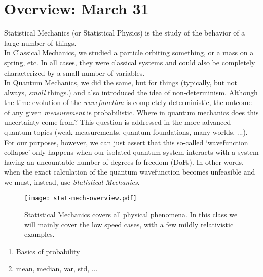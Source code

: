 \section{Overview: March 31}
\label{s:probability}

Statistical Mechanics (or Statistical Physics) is the study of the behavior of a large number of things.
\\

In Classical Mechanics, we studied a particle orbiting something, or a mass on a spring, etc. In all cases, they were classical systems and could also be completely characterized by a small number of variables.
\\

In Quantum Mechanics, we did the same, but for things (typically, but not always, \textit{small} things.) and also introduced the idea of non-determinism. Although the time evolution of the \emph{wavefunction} is completely deterministic, the outcome of any given \emph{measurement} is probabilistic. Where in quantum mechanics does this uncertainty come from? This question is addressed in the more advanced quantum topics (weak measurements, quantum foundations, many-worlds, ...). For our purposes, however, we can just assert that this so-called `wavefunction collapse' only happens when our isolated quantum system interacts with a system having an uncountable number of degrees fo freedom (DoFs). In other words, when the exact calculation of the quantum wavefunction becomes unfeasible and we must, instead, use \emph{Statistical Mechanics}.

\begin{figure}[h]
\centering
\texttt{[image: stat-mech-overview.pdf]}
\caption{Statistical Mechanics covers all physical phenomena. In this class we will mainly cover the low speed cases, with a few mildly relativistic examples.}
\end{figure}


\begin{enumerate}
\item Basics of probability
\item mean, median, var, std, ...
\end{enumerate}
